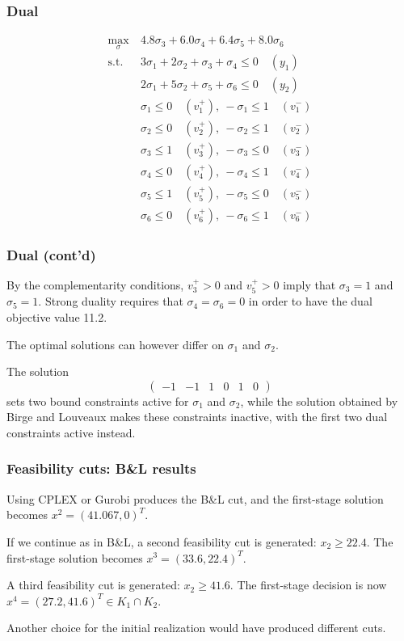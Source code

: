 \documentclass[aspectratio=169]{beamer}
\begin{document}
\begin{frame}
\frametitle{Dual}	

\begin{align*}
\max_{\sigma}\ & 4.8\sigma_3 + 6.0\sigma_4 + 6.4\sigma_5 + 8.0\sigma_6 \\
\text{s.t. } & 3\sigma_1 + 2 \sigma_2 + \sigma_3 + \sigma_4 \leq 0  \quad (y_1)\\
& 2\sigma_1 + 5 \sigma_2 + \sigma_5 + \sigma_6 \leq 0 \quad (y_2)\\
& \sigma_1 \leq 0 \quad (v_1^+),\ -\sigma_1 \leq 1 \quad (v_1^-) \\
& \sigma_2 \leq 0 \quad (v_2^+),\ -\sigma_2 \leq 1 \quad (v_2^-) \\
& \sigma_3 \leq 1 \quad (v_3^+),\ -\sigma_3 \leq 0 \quad (v_3^-) \\ 
& \sigma_4 \leq 0 \quad (v_4^+),\ -\sigma_4 \leq 1 \quad (v_4^-) \\
& \sigma_5 \leq 1 \quad (v_5^+),\ -\sigma_5 \leq 0 \quad  (v_5^-) \\
& \sigma_6 \leq 0 \quad (v_6^+),\ -\sigma_6 \leq 1 \quad  (v_6^-)
\end{align*}
	
\end{frame}

\begin{frame}
\frametitle{Dual (cont'd)}	

By the complementarity conditions, $v_3^+ > 0$ and $v_5^+ > 0$ imply that $\sigma_3 = 1$ and $\sigma_5 = 1$.
Strong duality requires that $\sigma_4 = \sigma_6 = 0$ in order to have the dual objective value 11.2.

\mbox{}

The optimal solutions can however differ on $\sigma_1$ and $\sigma_2$.

\mbox{}

The solution
\[
\begin{pmatrix} -1 & -1 & 1 & 0 & 1 & 0 \end{pmatrix}
\]
sets two bound constraints active for $\sigma_1$ and $\sigma_2$,
while the solution obtained by Birge and Louveaux makes these constraints inactive, with the first two dual constraints active instead.

\end{frame}

\begin{frame}
	\frametitle{Feasibility cuts: B\&L results}

Using CPLEX or Gurobi produces the B\&L cut, and
the first-stage solution becomes $x^2 = (41.067,0)^T$.
	
	\mbox{}
	
If we continue as in B\&L, a second feasibility cut is generated: $x_2 \geq 22.4$.
The first-stage solution becomes $x^3 = (33.6, 22.4)^T$.
	
	\mbox{}
	
	A third feasibility cut is generated: $x_2 \geq 41.6$.
	The first-stage decision is now $x^4 = (27.2, 41.6)^T \in K_1 \cap K_2$.
	
	\mbox{}
	
	Another choice for the initial realization would have produced different cuts.
	
\end{frame}
\end{document}
